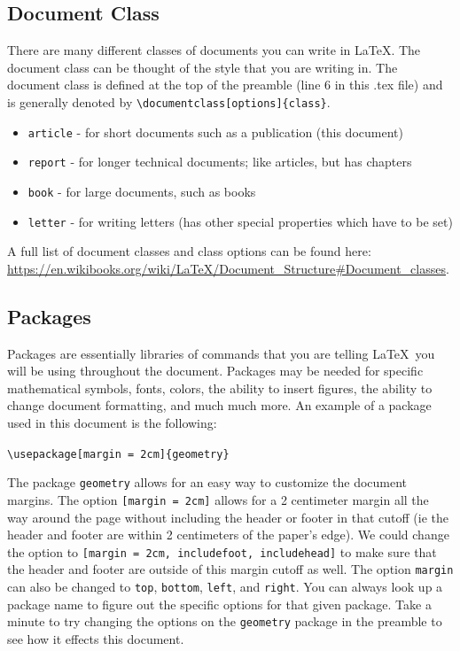 \documentclass[]{article}%
\newcommand{\bs}{\textbackslash}
\newcommand{\TT}[1]{\texttt{#1}}
\theoremstyle{definition}
\begin{document}
	\subsection{Document Class}
	There are many different classes of documents you can write in \LaTeX.
	The document class can be thought of the style that you are writing in.
	The document class is defined at the top of the preamble (line 6 in this .tex file) and is generally denoted by \TT{\bs documentclass[options]\{class\}}.
	\begin{itemize}
		\item \TT{article} - for short documents such as a publication (this document)
		\item \TT{report} - for longer technical documents; like articles, but has chapters 
		\item \TT{book} - for large documents, such as books 
		\item \TT{letter} - for writing letters (has other special properties which have to be set) 
	\end{itemize}
	A full list of document classes and class options can be found here: \url{https://en.wikibooks.org/wiki/LaTeX/Document_Structure#Document_classes}.
	
	\subsection{Packages}
	Packages are essentially libraries of commands that you are telling \LaTeX\ you will be using throughout the document.
	Packages may be needed for specific mathematical symbols, fonts, colors, the ability to insert figures, the ability to change document formatting, and much much more.
	An example of a package used in this document is the following:\\
	\begin{center}
		{\TT{\bs usepackage[margin = 2cm]\{geometry\}}}
	\end{center}
	The package \TT{geometry} allows for an easy way to customize the document margins.
	The option \TT{[margin = 2cm]} allows for a 2 centimeter margin all the way around the page without including the header or footer in that cutoff (ie the header and footer are within 2 centimeters of the paper's edge).
	We could change the option to \TT{[margin = 2cm, includefoot, includehead]} to make sure that the header and footer are outside of this margin cutoff as well.
	The option \TT{margin} can also be changed to \TT{top}, \TT{bottom}, \TT{left}, and \TT{right}.
	You can always look up a package name to figure out the specific options for that given package.
	Take a minute to try changing the options on the \TT{geometry} package in the preamble to see how it effects this document.
	\clearpage
	
\end{document}
